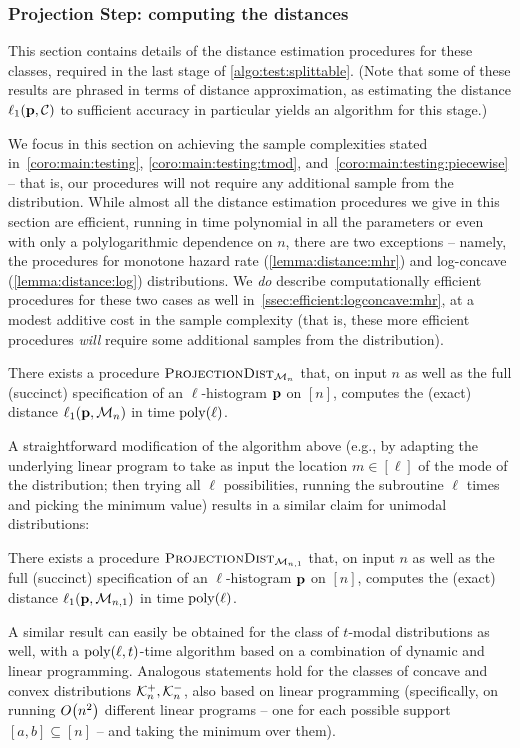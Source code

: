 \subsubsection{Projection Step: computing the distances} 
This section contains details of the distance estimation procedures for these classes, required in the last stage of \cref{algo:test:splittable}. (Note that some of these results are phrased in terms of distance approximation, as estimating the distance $\lp[1](\D,\class)$ to sufficient accuracy in particular yields an algorithm for this stage.)

We focus in this section on achieving the sample complexities stated in~\cref{coro:main:testing}, \cref{coro:main:testing:tmod}, and~\cref{coro:main:testing:piecewise} -- that is, our procedures will not require any additional sample from the distribution. While almost all the distance estimation procedures we give in this section are efficient, running in time polynomial in all the parameters or even with only a polylogarithmic dependence on $n$, there are two exceptions -- namely, the procedures for monotone hazard rate (\cref{lemma:distance:mhr}) and log-concave (\cref{lemma:distance:log}) distributions. We \emph{do} describe computationally efficient procedures for these two cases as well in~\cref{ssec:efficient:logconcave:mhr}, at a modest additive cost in the sample complexity (that is, these more efficient procedures \emph{will} require some additional samples from the distribution).

\begin{lemma}\label{lemma:distance:mon}
There exists a procedure $\estimdist[\classmon]$ that, on input $n$ as well as the full (succinct) specification of an $\ell$-histogram $\D$ on $[n]$, computes the (exact) distance $\lp[1](\D,\classmon)$ in time $\poly(\ell)$.
\end{lemma}

A straightforward modification of the algorithm above (e.g., by adapting the underlying linear program to take as input the location $m\in[\ell]$ of the mode of the distribution; then trying all $\ell$ possibilities, running the subroutine $\ell$ times and picking the minimum value) results in a similar claim for unimodal distributions:
\begin{lemma}[Unimodality]\label{lemma:distance:uni}
There exists a procedure $\estimdist[\classuni]$ that, on input $n$ as well as the full (succinct) specification of an $\ell$-histogram $\D$ on $[n]$, computes the (exact) distance $\lp[1](\D,\classuni)$ in time $\poly(\ell)$.
\end{lemma}
A similar result can easily be obtained for the class of $t$-modal distributions as well, with a $\poly(\ell,t)$-time algorithm based on a combination of dynamic and linear programming. 
 Analogous statements hold for the classes of concave and convex distributions $\classcvx, \classcve$, also based on linear programming (specifically, on running $\bigO{n^2}$ different linear programs -- one for each possible support $[a,b]\subseteq[n]$ -- and taking the minimum over them).

